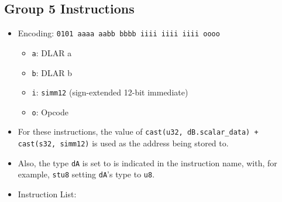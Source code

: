 \documentclass{article}
\begin{document}
	\subsection{Group 5 Instructions}
		\begin{itemize}
		\item Encoding: \texttt{0101 aaaa aabb bbbb  iiii iiii iiii oooo}
			\begin{itemize}
			\item \texttt{a}: DLAR a
			\item \texttt{b}: DLAR b
			\item \texttt{i}: \texttt{simm12} (sign-extended 12-bit
				immediate)
			\item \texttt{o}: Opcode
			\end{itemize}
		\item For these instructions, the value of
			\texttt{cast(u32, dB.scalar\_data) + cast(s32, simm12)}
			is used as the address being stored to.
		\item Also, the type \texttt{dA} is set to is indicated in the
			instruction name, with, for example, \texttt{stu8} setting
			\texttt{dA}'s type to \texttt{u8}.
		\item Instruction List:
			\begin{enumerate}


\end{enumerate}
\end{itemize}
\end{document}
